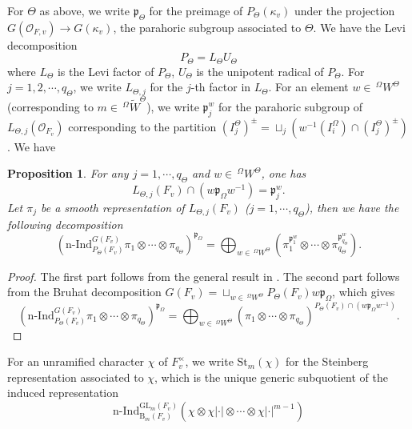 \documentclass[12pt,oneside,reqno]{amsart}
\theoremstyle{plain}
\newtheorem{proposition}[theorem]{Proposition}
\begin{document}
	
	
	
	For $\Theta$
	as above,
	we write
	$\mathfrak{p}_\Theta$
	for the preimage of
	$P_\Theta(\kappa_v)$
	under the projection
	$ G(\mathcal{O}_{F,v})
	\rightarrow
	G(\kappa_v)$,
	the parahoric subgroup associated to
	$\Theta$.
	We have the Levi decomposition
	\[
	P_\Theta
	=
	L_\Theta U_\Theta
	\]
	where
	$L_\Theta$
	is the Levi factor of
	$P_\Theta$,
	$U_\Theta$
	is the unipotent radical of
	$P_\Theta$.
	For $j=1,2,\cdots,q_\Theta$,
	we write
	$L_{\Theta,j}$
	for the $j$-th factor in
	$L_\Theta$.
	For an element
	$w\in\,^\Omega W^\Theta$
	(corresponding to $m\in\,^\Omega \widetilde{W}^\Theta$),
	we write
	$\mathfrak{p}^w_j$
	for the parahoric subgroup of
	$L_{\Theta,j}(\mathcal{O}_{F_v})$
	corresponding to the partition
	$(I_j^\Theta)^\pm=
	\sqcup_j(w^{-1}(I_i^\Omega)\cap(I_j^\Theta)^\pm)$.
	We have
	\begin{proposition}
		For any
		$j=1,\cdots,q_\Theta$
		and
		$w\in\,^\Omega W^\Theta$,
		one has
		\[
		L_{\Theta,j}(F_v)\cap
		\left(
		w\mathfrak{p}_\Omega w^{-1}
		\right)
		=
		\mathfrak{p}^w_j.
		\]
		Let
		$\pi_j$ be a smooth representation of
		$L_{\Theta,j}(F_v)$ ($j=1,\cdots,q_{\Theta}$),
		then we have
		the following decomposition
		\[
		\left(
		\mathrm{n}\text{-}\mathrm{Ind}_{P_\Theta(F_v)}^{ G(F_v)}
		\pi_1\otimes\cdots\otimes\pi_{q_\Theta}
		\right)^{\mathfrak{p}_\Omega}
		=
		\bigoplus_{w\in\,^\Omega W^\Theta}
		\left(
		\pi_1^{\mathfrak{p}_1^w}
		\otimes
		\cdots
		\otimes
		\pi_{q_\Theta}^{\mathfrak{p}_{q_\Theta}^w}
		\right).
		\]
	\end{proposition}
	\begin{proof}
		The first part follows from the general result in
		\cite[Proposition 1.3.3]{Casselman1995}.
		The second part follows from the
		Bruhat decomposition
		$ G(F_v)
		=
		\sqcup_{w\in\,^\Omega W^\Theta}
		P_\Theta(F_v)
		w
		\mathfrak{p}_\Omega$,
		which gives
		\[
		\left(
		\mathrm{n}\text{-}\mathrm{Ind}_{P_\Theta(F_v)}^{ G(F_v)}
		\pi_1\otimes\cdots\otimes\pi_{q_\Theta}
		\right)^{\mathfrak{p}_\Omega}
		=
		\bigoplus_{w\in\,^\Omega W^\Theta}
		\left(
		\pi_1\otimes\cdots\otimes\pi_{q_\Theta}
		\right)^{P_\Theta(F_v)\cap(w\mathfrak{p}_\Omega w^{-1})}.
		\]
	\end{proof}
	For an unramified character
	$\chi$ of $F_v^\times$,
	we write
	$\mathrm{St}_m(\chi)$ for the Steinberg representation associated to $\chi$, which is
	the unique generic subquotient of
	the induced representation
	\[
	\mathrm{n}\text{-}\mathrm{Ind}_{\mathrm{B}_m(F_v)}^{\mathrm{GL}_m(F_v)}
	\left(
	\chi\otimes\chi|\cdot|\otimes\cdots\otimes\chi|\cdot|^{m-1}
	\right)
	\]
\end{document}
